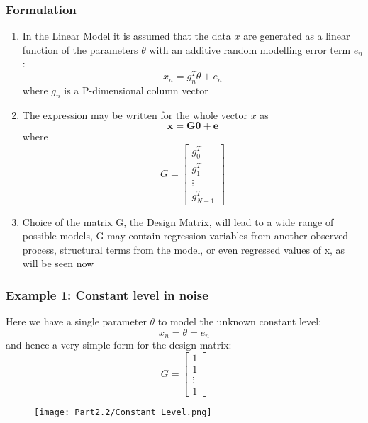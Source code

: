 \documentclass[12pt]{article}
\newcommand{\thetab}{\boldsymbol{\theta}}
\begin{document}
\subsubsection{Formulation}
\begin{enumerate}
    \item In the Linear Model it is assumed that the data $x$ are generated as a linear function of the parameters $\theta$ with an additive random modelling error term $e_n$:
    \[
    x_n = g_n^T \theta + e_n
    \]
    where $g_n$ is a P-dimensional column vector
    \item The expression may be written for the whole vector $x$ as 
    \[
    \mathbf{x = G \thetab + e}
    \]
    where 
    \[
    G = \begin{bmatrix}
    g_0^T \\
    g_1^T\\
    \vdots \\
    g_{N-1}^T
    \end{bmatrix}                                              
    \]
    \item Choice of the matrix G, the Design Matrix, will lead to a wide range of possible models, G may contain regression variables from another observed process, structural terms from the model, or even regressed values of x, as will be seen now
\end{enumerate}
\subsubsection{Example 1: Constant level in noise}

Here we have a single parameter $\theta $ to model the unknown constant level;
    \[
    x_n = \theta = e_n
    \]
    and hence a very simple form for the design matrix:
    \[
    G = \begin{bmatrix}
    1 \\
    1 \\
    \vdots \\
    1
    \end{bmatrix}
    \]
    \begin{figure}[H]
        \centering
        \texttt{[image: Part2.2/Constant Level.png]}
    \end{figure}
\end{document}
